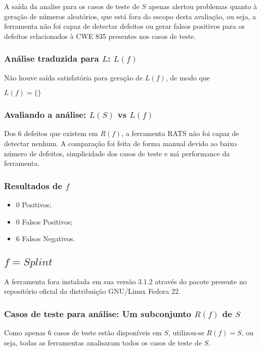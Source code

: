A saída da analise para os casos de teste de $S$ apenas alertou problemas quanto à geração de números aleatórios, que está fora do escopo desta avaliação, ou seja, a ferramenta não foi capaz de detectar defeitos ou gerar falsos positivos para os defeitos relacionados à CWE 835 presentes nos casos de teste.

\subsubsection{Análise traduzida para $L$: $L(f)$}

Não houve saída satisfatória para geração de $L(f)$, de modo que 

$L(f) = \lbrace\rbrace$

\subsubsection{Avaliando a análise: $L(S)$ vs $L(f)$}

Dos 6 defeitos que existem em $R(f)$, a ferramenta RATS não foi capaz de detectar nenhum. A comparação foi feita de forma manual devido ao baixo número de defeitos, simplicidade dos casos de teste e má performance da ferramenta.

\subsubsection{Resultados de $f$}

\begin{itemize}
  \item 0 Positivos;
  \item 0 Falsos Positivos;
  \item 6 Falsos Negativos.
\end{itemize}

\subsection{$f = Splint$}

A ferramenta fora instalada em sua versão 3.1.2 através do pacote presente no repositório oficial da distribuição GNU/Linux Fedora 22.

\subsubsection{Casos de teste para análise: Um subconjunto $R(f)$ de $S$}

Como apenas 6 casos de teste estão disponíveis em $S$, utilizou-se $R(f) = S$, ou seja, todas as ferramentas analisaram todos os casos de teste de $S$.

